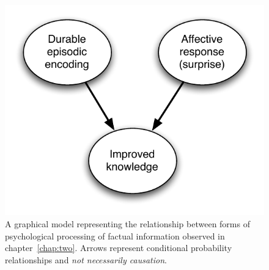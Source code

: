 \begin{figure}
\begin{center}
\includegraphics{causal1.pdf}
\end{center}
\caption{A graphical model representing the relationship between forms of
    psychological processing of factual information observed in
    chapter~\ref{chap:two}. Arrows represent conditional probability
    relationships and \emph{not necessarily causation}.}
\label{fig:causal-two}
\end{figure}
